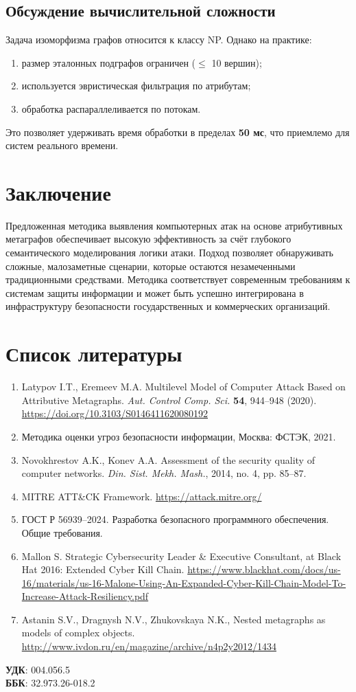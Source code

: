 \documentclass[12pt,a4paper]{extarticle}
\begin{document}
\subsection{Обсуждение вычислительной сложности}

Задача изоморфизма графов относится к классу NP. Однако на практике:
\begin{enumerate}
    \item размер эталонных подграфов ограничен ($\leq$ 10 вершин);
    \item используется эвристическая фильтрация по атрибутам;
    \item обработка распараллеливается по потокам.
\end{enumerate}
Это позволяет удерживать время обработки в пределах \textbf{50 мс}, что приемлемо для систем реального времени.

\section{Заключение}

Предложенная методика выявления компьютерных атак на основе атрибутивных метаграфов обеспечивает высокую эффективность за счёт глубокого семантического моделирования логики атаки. Подход позволяет обнаруживать сложные, малозаметные сценарии, которые остаются незамеченными традиционными средствами. Методика соответствует современным требованиям к системам защиты информации и может быть успешно интегрирована в инфраструктуру безопасности государственных и коммерческих организаций.

\section*{Список литературы}

\begin{enumerate}
    \item Latypov I.T., Eremeev M.A. Multilevel Model of Computer Attack Based on Attributive Metagraphs. \textit{Aut. Control Comp. Sci.} \textbf{54}, 944–948 (2020). \url{https://doi.org/10.3103/S0146411620080192}
    \item Методика оценки угроз безопасности информации, Москва: ФСТЭК, 2021.
    \item Novokhrestov A.K., Konev A.A. Assessment of the security quality of computer networks. \textit{Din. Sist. Mekh. Mash.}, 2014, no. 4, pp. 85–87.
    \item MITRE ATT\&CK Framework. \url{https://attack.mitre.org/}
    \item ГОСТ Р 56939–2024. Разработка безопасного программного обеспечения. Общие требования.
    \item Mallon S. Strategic Cybersecurity Leader \& Executive Consultant, at Black Hat 2016: Extended Cyber Kill Chain. \url{https://www.blackhat.com/docs/us-16/materials/us-16-Malone-Using-An-Expanded-Cyber-Kill-Chain-Model-To-Increase-Attack-Resiliency.pdf}
    \item Astanin S.V., Dragnysh N.V., Zhukovskaya N.K., Nested metagraphs as models of complex objects. \url{http://www.ivdon.ru/en/magazine/archive/n4p2y2012/1434}
\end{enumerate}

\vspace{1em}
\noindent\textbf{УДК}: 004.056.5 \\
\textbf{ББК}: 32.973.26-018.2
\end{document}

